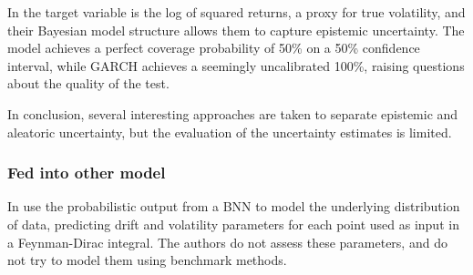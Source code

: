 In \textcite{Parker2021BayesianHeteroskedastic} the target variable is the log of squared returns, a proxy for true volatility, and their Bayesian model structure allows them to capture epistemic uncertainty. The model achieves a perfect coverage probability of 50\% on a 50\% confidence interval, while GARCH achieves a seemingly uncalibrated 100\%, raising questions about the quality of the test.

In conclusion, several interesting approaches are taken to separate epistemic and aleatoric uncertainty, but the evaluation of the uncertainty estimates is limited. 

\subsubsection{Fed into other model}

In \textcite{soleymani2022longterm} use the probabilistic output from a BNN to model the underlying distribution of data, predicting drift and volatility parameters for each point used as input in a Feynman-Dirac integral. The authors do not assess these parameters, and do not try to model them using benchmark methods. 

